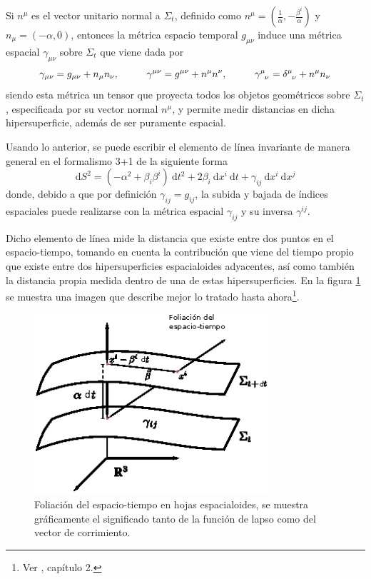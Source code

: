 \documentclass[11pt,twoside,openright,spanish]{report}
\numberwithin{equation}{chapter}
\numberwithin{figure}{chapter}
\numberwithin{table}{chapter}
\begin{document}
Si $n^{\mu}$ es el vector unitario normal a $\Sigma_t$, definido como $n^\mu=\left(\frac{1}{\alpha},-\frac{\beta^i}{\alpha}\right)$ y $n_\mu=\left(-\alpha,0\right)$, entonces la métrica espacio temporal $g_{\mu\nu}$ induce una métrica espacial $\gamma_{\mu\nu}$ sobre $\Sigma_t$ que viene dada por
\begin{equation}
\gamma_{\mu\nu}=g_{\mu\nu}+n_\mu n_\nu, \hspace{1cm}\gamma^{\mu\nu}=g^{\mu\nu}+n^\mu n^\nu, \hspace{1cm}\tensor{\gamma}{^\mu_\nu}=\tensor{\delta}{^\mu_\nu}+n^\mu n_\nu
\end{equation}
siendo esta métrica un tensor que proyecta todos los objetos geométricos sobre $\Sigma_t$, especificada por su vector normal $n^\mu$, y permite medir distancias en dicha hipersuperficie, además de ser puramente espacial.

Usando lo anterior, se puede escribir el elemento de línea invariante de manera general en el formalismo 3+1 de la siguiente forma
\begin{equation}
\text{d}S^2=\left(-\alpha^2+\beta_i \beta^i\right)\ \text{d}t^2 + 2\beta_i\ \text{d}x^i\ \text{d}t+ \gamma_{ij}\ \text{d}x^i\ \text{d}x^j
\end{equation}
donde, debido a que por definición $\gamma_{ij}=g_{ij}$, la subida y bajada de índices espaciales puede realizarse con la métrica espacial $\gamma_{ij}$ y su inversa $\gamma^{ij}$. 

Dicho elemento de línea mide la distancia que existe entre dos puntos en el espacio-tiempo, tomando en cuenta la contribución que viene del tiempo propio que existe entre dos hipersuperficies espacialoides adyacentes, así como también la distancia propia medida dentro de una de estas hipersuperficies. En la figura \ref{foliacion31} se muestra una imagen que describe mejor lo tratado hasta ahora\footnote{Ver \citet{Shapiro2010}, capítulo 2.}.
\begin{figure}[H]
	\centering
	\includegraphics[height=6.7cm]{foliacion31}
	\caption{Foliación del espacio-tiempo en hojas espacialoides, se muestra gráficamente el significado tanto de la función de lapso como del vector de corrimiento.}
	\label{foliacion31}
\end{figure}
\end{document}
